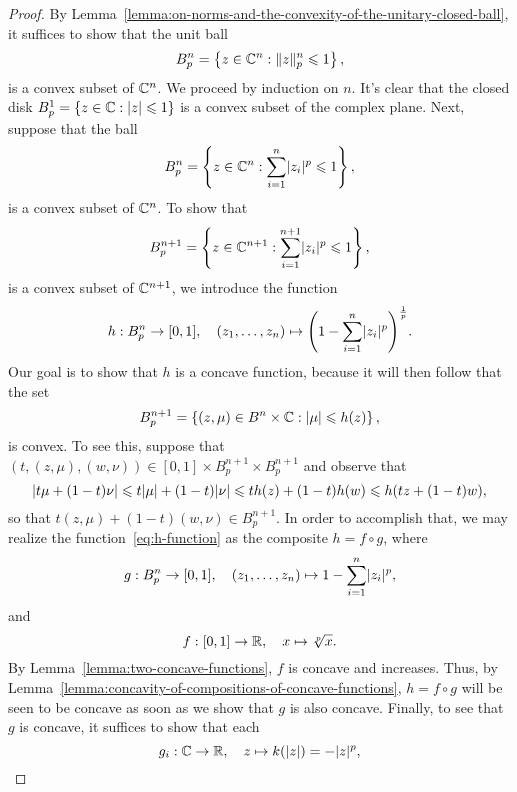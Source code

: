 \begin{proof}
  By Lemma~\ref{lemma:on-norms-and-the-convexity-of-the-unitary-closed-ball},
  it suffices to show that the unit ball
  \[
    B^{n}_{p}
    =
    \left\{z\in\complexfield^{n}:\norm<n>(p)[z]\leqslant{1}\right\},
  \]
  is a convex subset of \(\mathbb{C}^{n}\). We proceed by induction on
  \(n\). It's clear that the closed disk
  \(B^{1}_{p}=\left\{z\in\mathbb{C}:\lvert z\rvert\leqslant{1}\right\}\) is a
  convex subset of the complex plane. Next, suppose that the ball
  \[
    B^{n}_{p}
    =
    \left\{z\in\mathbb{C}^{n}:\sum_{i=1}^{n}\lvert z_{i}\rvert^{p}\leqslant{1}\right\},
  \]
  is a convex subset of \(\mathbb{C}^{n}\). To show that
  \[
    B^{n+1}_{p}
    =
    \left\{z\in\mathbb{C}^{n+1}:\sum_{i=1}^{n+1}\lvert z_{i}\rvert^{p}\leqslant{1}\right\},
  \]
  is a convex subset of \(\mathbb{C}^{n+1}\), we introduce the function
  \begin{equation}\label{eq:h-function}
    h:B^{n}_{p}\to{[0,1]},
    \quad{(z_{1},\ldots,z_{n})\mapsto\left(1-\sum_{i=1}^{n}\lvert z_{i}\rvert^{p}\right)^{\frac{1}{p}}}.
  \end{equation}
  Our goal is to show that \(h\) is a concave function, because it will then follow that
  the set
  \[
    B^{n+1}_{p}
    =
    \left\{(z,\mu)\in{B^{n}\times\mathbb{C}}:\lvert\mu\rvert\leqslant{h(z)}\right\},
  \]
  is convex. To see this, suppose that
  \((t,(z,\mu),(w,\nu))\in{[0,1]\times{B^{n+1}_{p}}\times{B^{n+1}_{p}}}\) and
  observe that
  \[
    \lvert t\mu+(1-t)\nu\rvert
    \leqslant{t\lvert\mu\rvert+(1-t)\lvert\nu\rvert}
    \leqslant{th(z)+(1-t)h(w)}
    \leqslant{h(tz+(1-t)w}),
  \]
  so that \(t(z,\mu)+(1-t)(w,\nu)\in{B^{n+1}_{p}}\). In order to accomplish
  that, we may realize the function~\eqref{eq:h-function} as the composite
  \(h=f\circ{g}\), where
  \begin{equation}\label{eq:g-function}
    g:B^{n}_{p}\to[0,1],
    \quad{(z_{1},\ldots,z_{n})\mapsto{1-\sum_{i=1}^{n}\lvert z_{i}\rvert^{p}}},
  \end{equation}
  and
  \begin{equation}\label{eq:f-function}
    f:[0,1]\to\mathbb{R},\quad{x\mapsto{\sqrt[p]{x}}}.
  \end{equation}
  By Lemma~\ref{lemma:two-concave-functions}, \(f\) is concave and increases.
  Thus, by Lemma~\ref{lemma:concavity-of-compositions-of-concave-functions},
  \(h=f\circ{g}\) will be seen to be concave as soon as we show that \(g\) is
  also concave. Finally, to see that \(g\) is concave, it suffices to show that
  each
  \[
    g_{i}:\mathbb{C}\to\mathbb{R},\quad{z\mapsto{k(\lvert z\rvert)=-\lvert z\rvert^{p}}},
\]
\end{proof}
